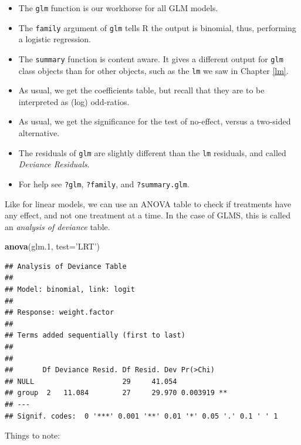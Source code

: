 \documentclass[]{book}
\newenvironment{Shaded}{\begin{snugshade}}{\end{snugshade}}
\newcommand{\KeywordTok}[1]{\textcolor[rgb]{0.13,0.29,0.53}{\textbf{{#1}}}}
\newcommand{\DataTypeTok}[1]{\textcolor[rgb]{0.13,0.29,0.53}{{#1}}}
\newcommand{\FloatTok}[1]{\textcolor[rgb]{0.00,0.00,0.81}{{#1}}}
\newcommand{\StringTok}[1]{\textcolor[rgb]{0.31,0.60,0.02}{{#1}}}
\newcommand{\NormalTok}[1]{{#1}}
\providecommand{\tightlist}{%
  \setlength{\itemsep}{0pt}\setlength{\parskip}{0pt}}
\theoremstyle{definition}
\theoremstyle{definition}
\theoremstyle{remark}
\begin{document}
\begin{itemize}
\tightlist
\item
  The \texttt{glm} function is our workhorse for all GLM models.
\item
  The \texttt{family} argument of \texttt{glm} tells R the output is
  binomial, thus, performing a logistic regression.
\item
  The \texttt{summary} function is content aware. It gives a different
  output for \texttt{glm} class objects than for other objects, such as
  the \texttt{lm} we saw in Chapter \ref{lm}.
\item
  As usual, we get the coefficients table, but recall that they are to
  be interpreted as (log) odd-ratios.
\item
  As usual, we get the significance for the test of no-effect, versus a
  two-sided alternative.
\item
  The residuals of \texttt{glm} are slightly different than the
  \texttt{lm} residuals, and called \emph{Deviance Residuals}.
\item
  For help see \texttt{?glm}, \texttt{?family}, and
  \texttt{?summary.glm}.
\end{itemize}

Like for linear models, we can use an ANOVA table to check if treatments
have any effect, and not one treatment at a time. In the case of GLMS,
this is called an \emph{analysis of deviance} table.

\begin{Shaded}
\begin{Highlighting}[]
\KeywordTok{anova}\NormalTok{(glm}\FloatTok{.1}\NormalTok{, }\DataTypeTok{test=}\StringTok{'LRT'}\NormalTok{)}
\end{Highlighting}
\end{Shaded}

\begin{verbatim}
## Analysis of Deviance Table
## 
## Model: binomial, link: logit
## 
## Response: weight.factor
## 
## Terms added sequentially (first to last)
## 
## 
##       Df Deviance Resid. Df Resid. Dev Pr(>Chi)   
## NULL                     29     41.054            
## group  2   11.084        27     29.970 0.003919 **
## ---
## Signif. codes:  0 '***' 0.001 '**' 0.01 '*' 0.05 '.' 0.1 ' ' 1
\end{verbatim}

Things to note:
\end{document}
